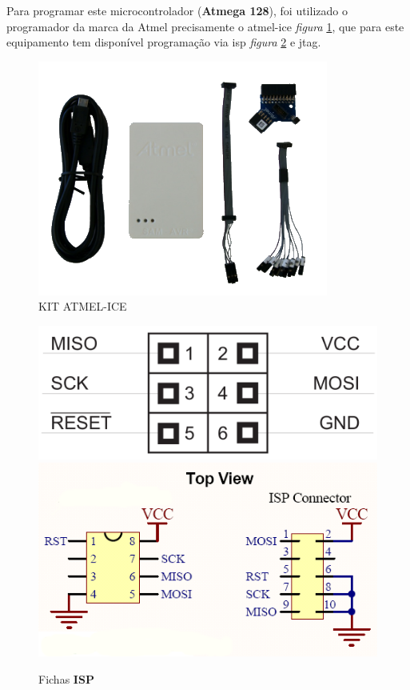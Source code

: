 \newpage
Para programar este microcontrolador (\textbf{Atmega 128}), foi utilizado o programador da marca da Atmel precisamente o \ac{atmel-ice} \textit{figura} \ref{Programador_1}, que para este equipamento tem disponível programação via \ac{isp} \textit{figura} \ref{ISP_6_8_10pin} e \ac{jtag}.
\begin{minipage}[!b]{.5\linewidth}
	\begin{figure}[H]
		\captionsetup{justification=raggedright,singlelinecheck=false}
		\flushleft
		\includegraphics[scale=0.75]{./image/PESTA/programador/Atmel_ice.png}
		\caption{KIT ATMEL-ICE}
		\label{Programador_1}
	\end{figure}
\end{minipage}
\hspace{.5cm}
\begin{minipage}[!b]{.5\linewidth}
	\begin{figure}[H]
		\captionsetup{justification=raggedright,singlelinecheck=false}
		\flushleft
		\includegraphics[scale=0.45]{./image/PESTA/programador/isp_6pin.png}
		\hspace{.3cm}
		\includegraphics[scale=0.5]{./image/PESTA/programador/isp_8e10pin.png}
		\caption{Fichas \textbf{ISP}}
		\label{ISP_6_8_10pin}
	\end{figure}
\end{minipage}
